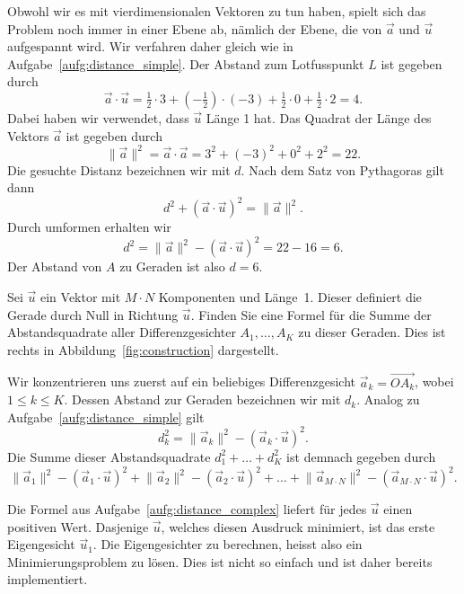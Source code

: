 \begin{losung}
	Obwohl wir es mit vierdimensionalen Vektoren zu tun haben, spielt sich das Problem noch immer in einer Ebene ab, nämlich der Ebene, die von $\vec a$ und $\vec u$ aufgespannt wird.
	Wir verfahren daher gleich wie in Aufgabe~\ref{aufg:distance_simple}.
	Der Abstand zum Lotfusspunkt $L$ ist gegeben durch
	\begin{equation*}
		\vec{a}\cdot\vec{u}=\tfrac{1}{2}\cdot 3+\left(-\tfrac{1}{2}\right)\cdot\left(-3\right)+\tfrac{1}{2}\cdot 0+\tfrac{1}{2}\cdot 2=4.
	\end{equation*}
	Dabei haben wir verwendet, dass $\vec{u}$ Länge 1 hat.
	Das Quadrat der Länge des Vektors $\vec a$ ist gegeben durch
	\begin{equation*}
		\lVert\vec{a}\rVert^2=\vec{a}\cdot\vec{a}=3^2+\left(-3\right)^2+0^2+2^2=22.
	\end{equation*}
	Die gesuchte Distanz bezeichnen wir mit $d$.
	Nach dem Satz von Pythagoras gilt dann
	\begin{equation*}
		d^2+\left(\vec{a}\cdot\vec{u}\right)^2=\lVert\vec{a}\rVert^2.
	\end{equation*}
	Durch umformen erhalten wir
	\begin{equation*}
		d^2=\lVert\vec{a}\rVert^2-\left(\vec{a}\cdot\vec{u}\right)^2=22-16=6.
	\end{equation*}
	Der Abstand von $A$ zu Geraden ist also $d=6$.
\end{losung}
\begin{aufgabe} \label{aufg:distance_complex}
	Sei $\vec{u}$ ein Vektor mit $M\cdot N$ Komponenten und Länge~1.
	Dieser definiert die Gerade durch Null in Richtung $\vec{u}$.
	Finden Sie eine Formel für die Summe der Abstandsquadrate aller Differenzgesichter $A_1,\ldots,A_K$ zu dieser Geraden.
	Dies ist rechts in Abbildung~\ref{fig:construction} dargestellt.
\end{aufgabe}
\begin{losung}
	Wir konzentrieren uns zuerst auf ein beliebiges Differenzgesicht $\vec{a}_k=\overrightarrow{OA_k}$, wobei $1\leq k\leq K$.
	Dessen Abstand zur Geraden bezeichnen wir mit $d_k$.
	Analog zu Aufgabe~\ref{aufg:distance_simple} gilt
	\begin{equation*}
		d_k^2=\lVert\vec{a}_k\rVert^2-\left(\vec{a}_k\cdot\vec{u}\right)^2.
	\end{equation*}
	Die Summe dieser Abstandsquadrate $d_1^2+\ldots+d_K^2$ ist demnach gegeben durch
	\begin{equation*}
		\lVert\vec{a}_1\rVert^2-\left(\vec{a}_1\cdot\vec{u}\right)^2
		+\lVert\vec{a}_2\rVert^2-\left(\vec{a}_2\cdot\vec{u}\right)^2
		+\ldots+
		\lVert\vec{a}_{M\cdot N}\rVert^2-\left(\vec{a}_{M\cdot N}\cdot\vec{u}\right)^2.
	\end{equation*}
\end{losung}
Die Formel aus Aufgabe~\ref{aufg:distance_complex} liefert für jedes $\vec{u}$ einen positiven Wert.
Dasjenige $\vec{u}$, welches diesen Ausdruck minimiert, ist das erste Eigengesicht $\vec{u}_1$.
Die Eigengesichter zu berechnen, heisst also ein Minimierungsproblem zu lösen.
Dies ist nicht so einfach und ist daher bereits implementiert.

